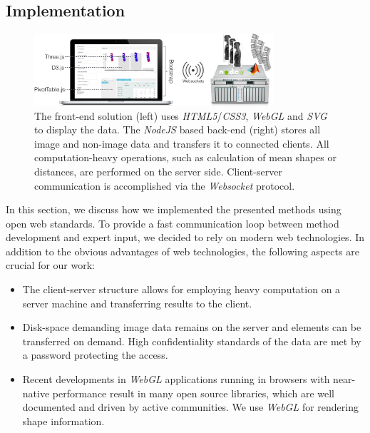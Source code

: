 \documentclass[journal]{style/vgtc} 			          %
\begin{document}
\subsection{Implementation} \label{implementation}
\begin{figure}[htb]
 \centering
 \label{fig:technologies}
 \includegraphics[width=3.5in]{figures/technologies}
 \caption{The front-end solution (left) uses \emph{HTML5}/\emph{CSS3}, \emph{WebGL} and \emph{SVG} to display the data.
 The \emph{NodeJS} based back-end (right) stores all image and non-image data and transfers it to connected clients.
 All computation-heavy operations, such as calculation of mean shapes or distances, are performed on the server side. 
 Client-server communication is accomplished via the \emph{Websocket} protocol.
 }
\end{figure}
In this section, we discuss how we implemented the presented methods using open web standards.
%
To provide a fast communication loop between method development and expert input, we decided to rely on modern web technologies.
%
In addition to the obvious advantages of web technologies, the following aspects are crucial for our work:
\begin{itemize} %
	\item The client-server structure allows for employing heavy computation on a server machine and transferring results to the client.
	\item Disk-space demanding image data remains on the server and elements can be transferred on demand.
	High confidentiality standards of the data are met by a password protecting the access.%
	\item Recent developments in \emph{WebGL} applications running in browsers with near-native performance result in many open source libraries, which are well documented and driven by active communities. We use \emph{WebGL} for rendering shape information.
\end{itemize}
\end{document}
